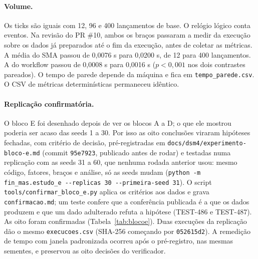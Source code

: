 \documentclass[10pt,a4paper]{article}
\newcommand{\code}[1]{\texttt{#1}}
\begin{document}
\paragraph{Volume.} Os ticks são iguais com 12, 96 e 400 lançamentos de base. O relógio lógico
conta eventos. Na revisão do PR \#10, ambos os braços passaram a medir da execução sobre os dados já
preparados até o fim da execução, antes de coletar as métricas. A média do SMA passou de 0,0076 s para
0,0200 s, de 12 para 400 lançamentos. A do workflow passou de 0,0008 s para 0,0016 s
($p<0{,}001$ nos dois contrastes pareados). O tempo de parede depende da máquina e fica em
\code{tempo\_parede.csv}. O CSV de métricas determinísticas permaneceu idêntico.

\paragraph{Replicação confirmatória.} O bloco E foi desenhado depois de ver os blocos A a D; o que ele mostrou
poderia ser acaso das seeds 1 a 30. Por isso as oito conclusões viraram hipóteses fechadas, com critério de decisão,
pré-registradas em \code{docs/dsm4/experimento-bloco-e.md} (commit \code{95e7923}, publicado antes de rodar) e testadas
numa replicação com as seeds 31 a 60, que nenhuma rodada anterior usou: mesmo código, fatores, braços e análise, só as
seeds mudam (\code{python -m fin\_mas.estudo\_e -{}-replicas 30 -{}-primeira-seed 31}). O script
\code{tools/confirmar\_bloco\_e.py} aplica os critérios aos dados e grava \code{confirmacao.md}; um teste confere que a
conferência publicada é a que os dados produzem e que um dado adulterado refuta a hipótese (TEST-486 e TEST-487).
As oito foram confirmadas (Tabela~\ref{tab:blocoe}). Duas execuções da replicação dão o mesmo \code{execucoes.csv}
(SHA-256 começando por \code{052615d2}). A remedição de tempo com janela padronizada ocorreu após o
pré-registro, nas mesmas sementes, e preservou as oito decisões do verificador.
\end{document}
